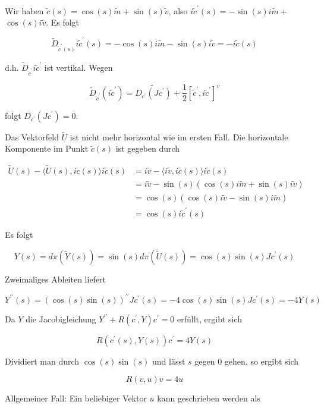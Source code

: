 \documentclass[10pt, letterpaper]{article}
\begin{document}
Wir haben $\tilde{c}(s)=\cos (s) \tilde{m}+\sin (s) \tilde{v}$, also $i \tilde{c}^{\prime}(s)=-\sin (s) i \tilde{m}+$ $\cos (s) i \tilde{v}$. Es folgt

$$
\tilde{D}_{\tilde{c}^{\prime}(s)} i \tilde{c}^{\prime}(s)=-\cos (s) i \tilde{m}-\sin (s) i \tilde{v}=-i \tilde{c}(s)
$$

d.h. $\tilde{D}_{\tilde{c}^{\prime}} i \tilde{c}^{\prime}$ ist vertikal. Wegen

$$
\tilde{D}_{\tilde{c}^{\prime}}\left(i \tilde{c}^{\prime}\right)=\widetilde{D_{c^{\prime}}\left(J c^{\prime}\right)}+\frac{1}{2}\left[\tilde{c}^{\prime}, i \tilde{c}^{\prime}\right]^{v}
$$

folgt $D_{c^{\prime}}\left(J c^{\prime}\right)=0$.

Das Vektorfeld $\tilde{U}$ ist nicht mehr horizontal wie im ersten Fall. Die horizontale Komponente im Punkt $\tilde{c}(s)$ ist gegeben durch

$$
\begin{aligned}
\tilde{U}(s)-\langle\tilde{U}(s), i \tilde{c}(s)\rangle i \tilde{c}(s) & =i \tilde{v}-\langle i \tilde{v}, i \tilde{c}(s)\rangle i \tilde{c}(s) \\
& =i \tilde{v}-\sin (s)(\cos (s) i \tilde{m}+\sin (s) i \tilde{v}) \\
& =\cos (s)(\cos (s) i \tilde{v}-\sin (s) i \tilde{m}) \\
& =\cos (s) i \tilde{c}^{\prime}(s)
\end{aligned}
$$

Es folgt


\begin{equation*}
Y(s)=d \pi(\tilde{Y}(s))=\sin (s) d \pi(\tilde{U}(s))=\cos (s) \sin (s) J c^{\prime}(s) \tag{10}
\end{equation*}


Zweimaliges Ableiten liefert

$$
Y^{\prime \prime}(s)=(\cos (s) \sin (s))^{\prime \prime} J c^{\prime}(s)=-4 \cos (s) \sin (s) J c^{\prime}(s)=-4 Y(s)
$$

Da $Y$ die Jacobigleichung $Y^{\prime \prime}+R\left(c^{\prime}, Y\right) c^{\prime}=0$ erfüllt, ergibt sich

$$
R\left(c^{\prime}(s), Y(s)\right) c^{\prime}=4 Y(s)
$$

Dividiert man durch $\cos (s) \sin (s)$ und lässt $s$ gegen 0 gehen, so ergibt sich

$$
R(v, u) v=4 u
$$

Allgemeiner Fall: Ein beliebiger Vektor $u$ kann geschrieben werden als
\end{document}
